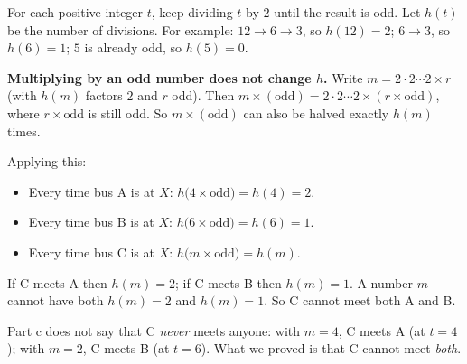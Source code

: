 {
For each positive integer $t$, keep dividing $t$ by $2$ until the result is odd. Let $h(t)$ be the number of divisions. For example: $12\to 6\to 3$, so $h(12)=2$; $6\to3$, so $h(6)=1$; $5$ is already odd, so $h(5)=0$.
\begin{proofbox}\textbf{Multiplying by an odd number does not change $h$.} Write $m=2\cdot2\cdots2\times r$ (with $h(m)$ factors $2$ and $r$ odd). Then $m\times(\text{odd})=2\cdot2\cdots2\times(r\times\text{odd})$, where $r\times\text{odd}$ is still odd. So $m\times(\text{odd})$ can also be halved exactly $h(m)$ times.\end{proofbox}
Applying this:
\begin{itemize}[leftmargin=1.3em,itemsep=1pt]
\item Every time bus A is at $X$: $h\big(4\times\text{odd}\big)=h(4)=2$.
\item Every time bus B is at $X$: $h\big(6\times\text{odd}\big)=h(6)=1$.
\item Every time bus C is at $X$: $h\big(m\times\text{odd}\big)=h(m)$.
\end{itemize}
If C meets A then $h(m)=2$; if C meets B then $h(m)=1$. A number $m$ cannot have both $h(m)=2$ and $h(m)=1$. So C cannot meet both A and B.
\begin{warnbox}Part c does not say that C \emph{never} meets anyone: with $m=4$, C meets A (at $t=4$); with $m=2$, C meets B (at $t=6$). What we proved is that C cannot meet \emph{both}.\end{warnbox}
}


